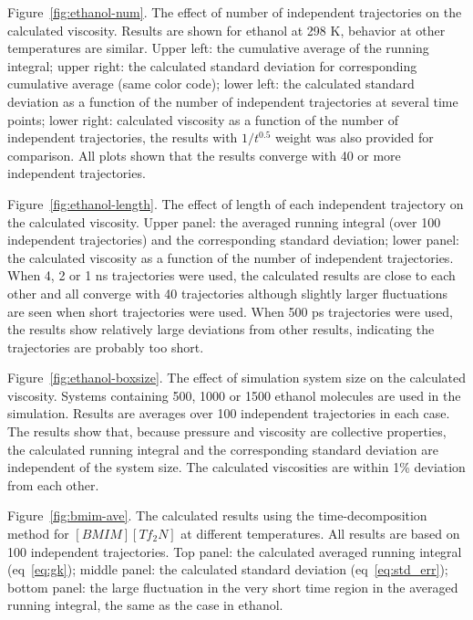 \documentclass[12pt]{article}
\begin{document}
Figure~\ref{fig:ethanol-num}.
The effect of number of independent trajectories on the calculated viscosity.
Results are shown for ethanol at 298 K, behavior at other temperatures are similar.
Upper left: the cumulative average of the running integral;
upper right: the calculated standard deviation for corresponding cumulative average (same color code);
lower left: the calculated standard deviation as a function of the number of independent trajectories at several time points;
lower right: calculated viscosity as a function of the number of independent trajectories,
the results with $1/t^{0.5}$ weight was also provided for comparison.
All plots shown that the results  converge with 40 or more independent trajectories.


Figure~\ref{fig:ethanol-length}.
The effect of length of each independent trajectory on the calculated viscosity.
Upper panel: the averaged running integral (over 100 independent trajectories) and the corresponding standard deviation;
lower panel: the calculated viscosity as a function of the number of independent trajectories.
When 4, 2 or 1 ns trajectories were used,
the calculated results are close to each other
and all converge with 40 trajectories although slightly larger fluctuations are seen when short trajectories were used.
When 500 ps trajectories were used,
the results show relatively large deviations from other results,
indicating the trajectories are probably too short.

Figure~\ref{fig:ethanol-boxsize}.
The effect of simulation system size on the calculated viscosity.
Systems containing 500, 1000 or 1500 ethanol molecules are used in the simulation.
Results are averages over 100 independent trajectories in each case.
The results show that,
because pressure and viscosity are collective properties,
the calculated running integral and the corresponding standard deviation are independent of the system size.
The calculated viscosities are within 1\% deviation from each other.

Figure~\ref{fig:bmim-ave}.
The calculated results using the time-decomposition method for $[BMIM][Tf_2N]$ at different temperatures.
All results are based on 100 independent trajectories.
Top panel: the calculated averaged running integral (eq~\ref{eq:gk});
middle panel: the calculated standard deviation (eq~\ref{eq:std_err});
bottom panel: the large fluctuation in the very short time region in the averaged running integral,
the same as the case in ethanol.
\end{document}
